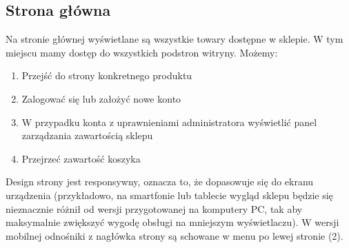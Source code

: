 \documentclass[12pt,a4paper,titlepage]{article}
\begin{document}
\subsection{Strona główna}
Na stronie głównej wyświetlane są wszystkie towary dostępne w sklepie. W tym miejscu mamy dostęp do wszystkich podstron witryny. Możemy:
\begin{enumerate}
    \item Przejść do strony konkretnego produktu
    \item Zalogować się lub założyć nowe konto
    \item W przypadku konta z uprawnieniami administratora wyświetlić panel zarządzania zawartością sklepu
    \item Przejrzeć zawartość koszyka
\end{enumerate}
Design strony jest responsywny, oznacza to, że dopasowuje się do ekranu urządzenia (przykładowo, na smartfonie lub tablecie wygląd sklepu będzie się nieznacznie różnił od wersji przygotowanej na komputery PC, tak aby maksymalnie zwiększyć wygodę obsługi na mniejszym wyświetlaczu). W wersji mobilnej odnośniki z nagłówka strony są schowane w menu po lewej stronie (2).
\end{document}
